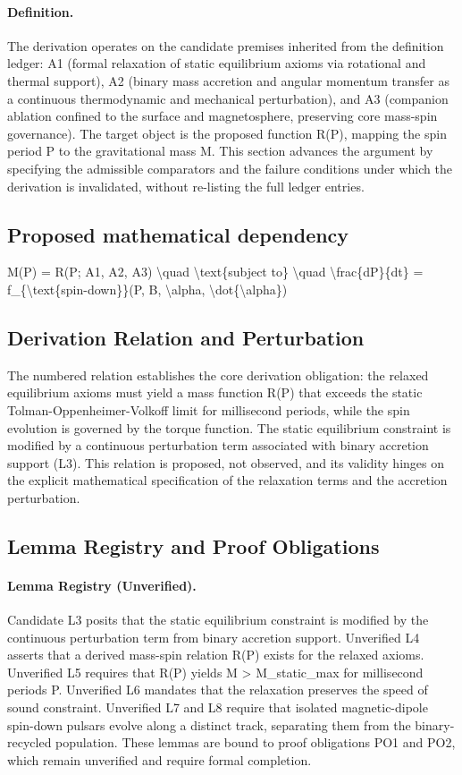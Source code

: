\documentclass[conference]{IEEEtran}
\begin{document}
\paragraph{Definition.} The derivation operates on the candidate premises inherited from the definition ledger: A1 (formal relaxation of static equilibrium axioms via rotational and thermal support), A2 (binary mass accretion and angular momentum transfer as a continuous thermodynamic and mechanical perturbation), and A3 (companion ablation confined to the surface and magnetosphere, preserving core mass-spin governance). The target object is the proposed function R(P), mapping the spin period P to the gravitational mass M. This section advances the argument by specifying the admissible comparators and the failure conditions under which the derivation is invalidated, without re-listing the full ledger entries.

\subsection{Proposed mathematical dependency}
M(P) = R(P; A1, A2, A3) \textbackslash{}quad \textbackslash{}text\{subject to\} \textbackslash{}quad \textbackslash{}frac\{dP\}\{dt\} = f\_\{\textbackslash{}text\{spin-down\}\}(P, B, \textbackslash{}alpha, \textbackslash{}dot\{\textbackslash{}alpha\})

\subsection{Derivation Relation and Perturbation}
The numbered relation establishes the core derivation obligation: the relaxed equilibrium axioms must yield a mass function R(P) that exceeds the static Tolman-Oppenheimer-Volkoff limit for millisecond periods, while the spin evolution is governed by the torque function. The static equilibrium constraint is modified by a continuous perturbation term associated with binary accretion support (L3). This relation is proposed, not observed, and its validity hinges on the explicit mathematical specification of the relaxation terms and the accretion perturbation.

\subsection{Lemma Registry and Proof Obligations}
\paragraph{Lemma Registry (Unverified).} Candidate L3 posits that the static equilibrium constraint is modified by the continuous perturbation term from binary accretion support. Unverified L4 asserts that a derived mass-spin relation R(P) exists for the relaxed axioms. Unverified L5 requires that R(P) yields M > M\_static\_max for millisecond periods P. Unverified L6 mandates that the relaxation preserves the speed of sound constraint. Unverified L7 and L8 require that isolated magnetic-dipole spin-down pulsars evolve along a distinct track, separating them from the binary-recycled population. These lemmas are bound to proof obligations PO1 and PO2, which remain unverified and require formal completion.
\end{document}
